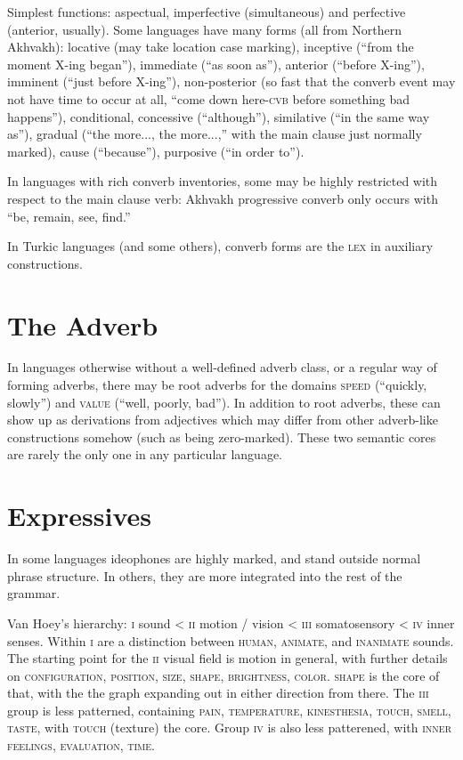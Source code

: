 \documentclass[11pt]{article}
\newcommand{\I}[1]{\textsc{#1}}   %
\begin{document}
Simplest functions: aspectual, imperfective (simultaneous) and
perfective (anterior, usually). Some languages have many forms (all
from Northern Akhvakh): locative (may take location case marking),
inceptive (``from the moment X-ing began''), immediate (``as soon
as''), anterior (``before X-ing''), imminent (``just before X-ing''),
non-posterior (so fast that the converb event may not have time to
occur at all, ``come down here-\I{cvb} before something bad
happens''), conditional, concessive (``although''), similative (``in
the same way as''), gradual (``the more..., the more...,'' with the
main clause just normally marked), cause (``because''), purposive
(``in order to'').

In languages with rich converb inventories, some may be highly
restricted with respect to the main clause verb: Akhvakh progressive
converb only occurs with ``be, remain, see, find.''

In Turkic languages (and some others), converb forms are the \I{lex}
in auxiliary constructions.


\section{The Adverb}
In languages otherwise without a well-defined adverb class, or a
regular way of forming adverbs, there may be root adverbs for the
domains \I{speed} (``quickly, slowly'') and \I{value} (``well,
poorly, bad''). In addition to root adverbs, these can show up as
derivations from adjectives which may differ from other adverb-like
constructions somehow (such as being zero-marked). These two semantic
cores are rarely the only one in any particular language.


\section{Expressives}
In some languages ideophones are highly marked, and stand outside
normal phrase structure.  In others, they are more integrated into the
rest of the grammar.

Van Hoey's hierarchy: \I{i} sound < \I{ii} motion / vision < \I{iii}
somatosensory < \I{iv} inner senses.  Within \I{i} are a distinction
between \I{human}, \I{animate}, and \I{inanimate} sounds.  The
starting point for the \I{ii} visual field is motion in general, with
further details on \I{configuration, position, size, shape,
brightness, color}.  \I{shape} is the core of that, with the the
graph expanding out in either direction from there.  The \I{iii} group
is less patterned, containing \I{pain, temperature, kinesthesia,
touch, smell, taste,} with \I{touch} (texture) the core.  Group
\I{iv} is also less patterened, with \I{inner feelings, evaluation,
time}.
\end{document}
